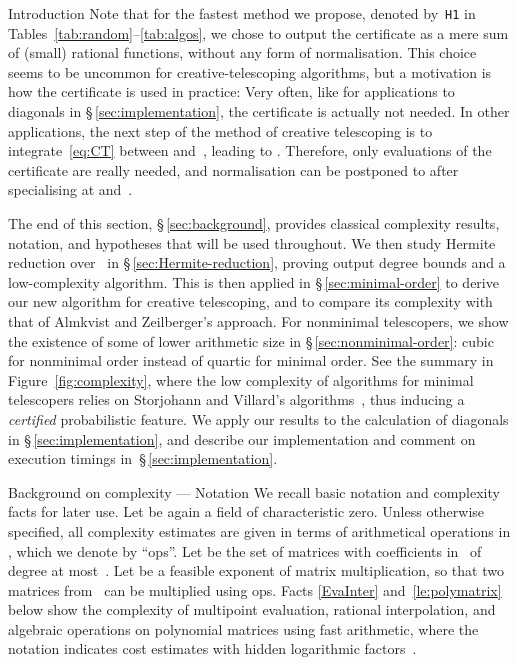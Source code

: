 \documentclass{sig-alt-full}
\begin{document}
\begin{section}{Introduction}
Note that for the fastest method we propose, denoted by~\verb+H1+ in
Tables~\ref{tab:random}--\ref{tab:algos}, we chose to output the
certificate as a mere sum of (small) rational functions, without any
form of normalisation. This choice seems to be uncommon for
creative-telescoping algorithms, but a motivation is how the
certificate is used in practice: Very often, like for applications
to diagonals in \S\,\ref{sec:implementation}, the certificate is
actually not needed. In other applications, the next step of the
method of creative telescoping is to integrate~\eqref{eq:CT} between
 and~, leading to . Therefore, only evaluations of the certificate are really
needed, and normalisation can be postponed to after specialising at
 and~.

The end of this section, \S\,\ref{sec:background}, provides classical
complexity results, notation, and hypotheses that will be used
throughout.  We then study Hermite reduction over~ in
\S\,\ref{sec:Hermite-reduction}, proving output degree bounds and a
low-complexity algorithm.  This is then applied in
\S\,\ref{sec:minimal-order} to derive our new algorithm for creative
telescoping, and to compare its complexity with that of Almkvist and
Zeilberger's approach.
For nonminimal telescopers, we show the existence
of some of lower arithmetic size in \S\,\ref{sec:nonminimal-order}:
cubic for nonminimal order instead of quartic for minimal order.
See the summary in Figure~\ref{fig:complexity}, where the low
complexity of algorithms for minimal telescopers relies on Storjohann
and Villard's algorithms~\cite{Storjohann2005}, thus inducing a
\emph{certified\/} probabilistic feature.
We apply our results to the
calculation of diagonals in \S\,\ref{sec:implementation}, and describe our
implementation and comment on execution timings
in~\S\,\ref{sec:implementation}.

\begin{subsection}{Background on complexity --- Notation}
\label{sec:background} We recall basic notation and complexity facts
for later use. Let  be again a field of characteristic zero.
Unless otherwise specified, all complexity estimates are given in
terms of arithmetical operations in , which we denote by ``ops''.
Let  be the set of  matrices
with coefficients in~ of degree at most~. Let
 be a feasible exponent of matrix multiplication, so
that two matrices from~ can be multiplied using
 ops.
Facts \ref{EvaInter} and~\ref{le:polymatrix} below
show the complexity of multipoint evaluation, rational
interpolation,
and algebraic operations on polynomial matrices using fast
arithmetic, where the notation  indicates
cost estimates with hidden logarithmic
factors~\cite[Def.~25.8]{MCA2003}.


\end{subsection}
\end{section}
\end{document}
